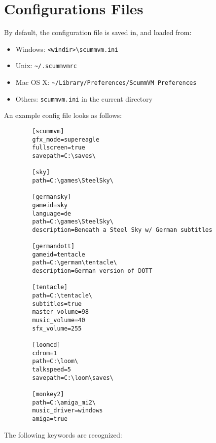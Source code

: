 

\section{Configurations Files}


By default, the configuration file is saved in, and loaded from:
%
\begin{itemize}
\item Windows: \verb#<windir>\scummvm.ini#
\item Unix: \verb#~/.scummvmrc#
\item Mac OS X: \verb#~/Library/Preferences/ScummVM Preferences#
\item Others: \verb#scummvm.ini# in the current directory
\end{itemize}
%
An example config file looks as follows:
%
\begin{verbatim}
        [scummvm]
        gfx_mode=supereagle
        fullscreen=true
        savepath=C:\saves\

        [sky]
        path=C:\games\SteelSky\

        [germansky]
        gameid=sky
        language=de
        path=C:\games\SteelSky\
        description=Beneath a Steel Sky w/ German subtitles
        
        [germandott]
        gameid=tentacle
        path=C:\german\tentacle\
        description=German version of DOTT

        [tentacle]
        path=C:\tentacle\
        subtitles=true
        master_volume=98
        music_volume=40
        sfx_volume=255

        [loomcd]
        cdrom=1
        path=C:\loom\
        talkspeed=5
        savepath=C:\loom\saves\
        
        [monkey2]
        path=C:\amiga_mi2\
        music_driver=windows
        amiga=true
\end{verbatim}
%
The following keywords are recognized:

